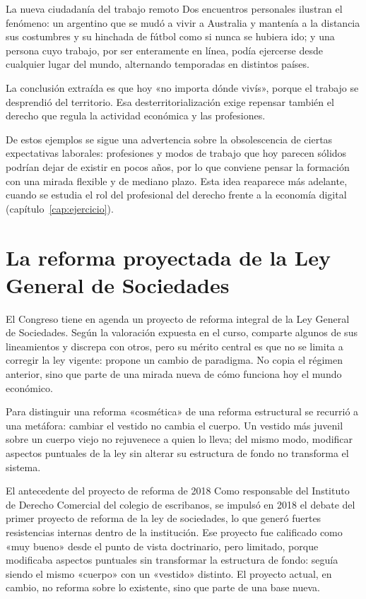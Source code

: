 \documentclass[12pt,oneside]{book}
\begin{document}
\begin{example}{La nueva ciudadanía del trabajo remoto}
Dos encuentros personales ilustran el fenómeno: un argentino que se mudó a vivir a Australia y mantenía a la distancia sus costumbres y su hinchada de fútbol como si nunca se hubiera ido; y una persona cuyo trabajo, por ser enteramente en línea, podía ejercerse desde cualquier lugar del mundo, alternando temporadas en distintos países.

La conclusión extraída es que hoy «no importa dónde vivís», porque el trabajo se desprendió del territorio. Esa desterritorialización exige repensar también el derecho que regula la actividad económica y las profesiones.
\end{example}

De estos ejemplos se sigue una advertencia sobre la obsolescencia de ciertas expectativas laborales: profesiones y modos de trabajo que hoy parecen sólidos podrían dejar de existir en pocos años, por lo que conviene pensar la formación con una mirada flexible y de mediano plazo. Esta idea reaparece más adelante, cuando se estudia el rol del profesional del derecho frente a la economía digital (capítulo~\ref{cap:ejercicio}).

\section{La reforma proyectada de la Ley General de Sociedades}
\label{sec:reforma}

El Congreso tiene en agenda un proyecto de reforma integral de la Ley General de Sociedades. Según la valoración expuesta en el curso, comparte algunos de sus lineamientos y discrepa con otros, pero su mérito central es que no se limita a corregir la ley vigente: propone un cambio de paradigma. No copia el régimen anterior, sino que parte de una mirada nueva de cómo funciona hoy el mundo económico.

Para distinguir una reforma «cosmética» de una reforma estructural se recurrió a una metáfora: cambiar el vestido no cambia el cuerpo. Un vestido más juvenil sobre un cuerpo viejo no rejuvenece a quien lo lleva; del mismo modo, modificar aspectos puntuales de la ley sin alterar su estructura de fondo no transforma el sistema.

\begin{example}{El antecedente del proyecto de reforma de 2018}
Como responsable del Instituto de Derecho Comercial del colegio de escribanos, se impulsó en 2018 el debate del primer proyecto de reforma de la ley de sociedades, lo que generó fuertes resistencias internas dentro de la institución. Ese proyecto fue calificado como «muy bueno» desde el punto de vista doctrinario, pero limitado, porque modificaba aspectos puntuales sin transformar la estructura de fondo: seguía siendo el mismo «cuerpo» con un «vestido» distinto. El proyecto actual, en cambio, no reforma sobre lo existente, sino que parte de una base nueva.
\end{example}
\end{document}
